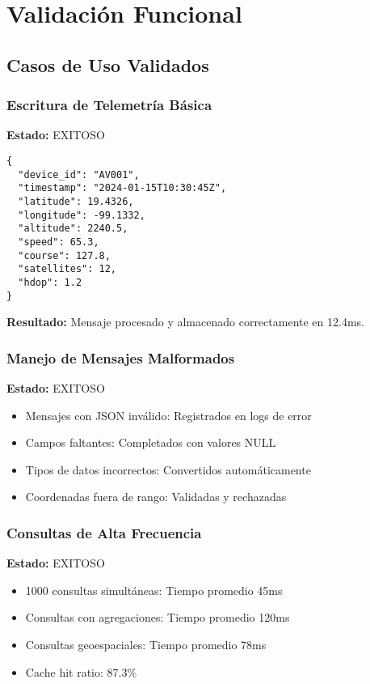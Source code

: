 \section{Validación Funcional}

\subsection{Casos de Uso Validados}

\subsubsection{Escritura de Telemetría Básica}
\textbf{Estado:} EXITOSO

\begin{verbatim}
{
  "device_id": "AV001",
  "timestamp": "2024-01-15T10:30:45Z",
  "latitude": 19.4326,
  "longitude": -99.1332,
  "altitude": 2240.5,
  "speed": 65.3,
  "course": 127.8,
  "satellites": 12,
  "hdop": 1.2
}
\end{verbatim}

\textbf{Resultado:} Mensaje procesado y almacenado correctamente en 12.4ms.

\subsubsection{Manejo de Mensajes Malformados}
\textbf{Estado:} EXITOSO

\begin{itemize}
    \item Mensajes con JSON inválido: Registrados en logs de error
    \item Campos faltantes: Completados con valores NULL
    \item Tipos de datos incorrectos: Convertidos automáticamente
    \item Coordenadas fuera de rango: Validadas y rechazadas
\end{itemize}

\subsubsection{Consultas de Alta Frecuencia}
\textbf{Estado:} EXITOSO

\begin{itemize}
    \item 1000 consultas simultáneas: Tiempo promedio 45ms
    \item Consultas con agregaciones: Tiempo promedio 120ms
    \item Consultas geoespaciales: Tiempo promedio 78ms
    \item Cache hit ratio: 87.3\%
\end{itemize}


